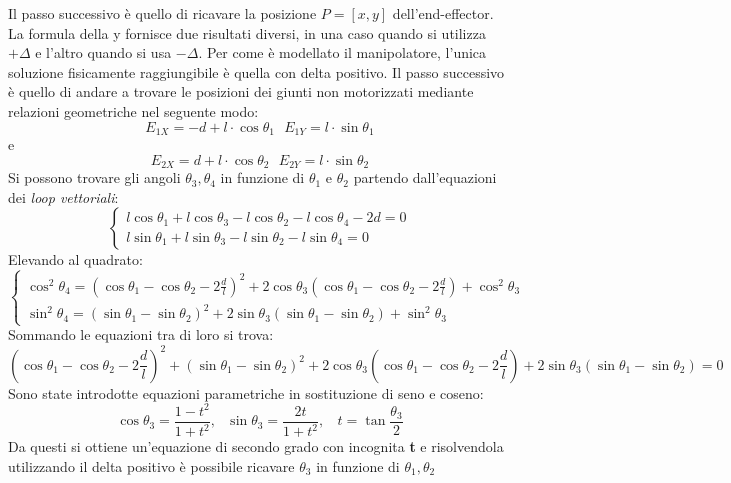 Il passo successivo è quello di ricavare la posizione $P=[x,y]$ dell'end-effector. La formula della y fornisce due risultati diversi, in una caso quando si utilizza $+\Delta$ e l'altro quando si usa $-\Delta$. Per come è modellato il manipolatore, l'unica soluzione fisicamente raggiungibile è quella con delta positivo. 
Il passo successivo è quello di andare a trovare le posizioni dei giunti non motorizzati mediante relazioni geometriche nel seguente modo: 
\begin{equation*}
    E_{1X} = -d+l\cdot \cos\theta_1 \ \ \  E_{1Y}=l\cdot \sin\theta_1
\end{equation*}
e
\begin{equation*}
    E_{2X} = d+ l\cdot \cos\theta_2 \ \ \  E_{2Y} = l\cdot \sin\theta_2
\end{equation*}
Si possono trovare gli angoli $\theta_3 , \theta_4$ in funzione di $\theta_1$ e $\theta_2$ partendo dall'equazioni dei \textit{loop vettoriali}:
\begin{equation}
	\begin{cases}
		l\cos\theta_1 + l\cos\theta_3 - l\cos\theta_2 -l\cos\theta_4 -2d = 0 \\
		l\sin\theta_1 +l\sin\theta_3 - l\sin\theta_2 -l\sin\theta_4 = 0
	\end{cases}
\label{eq:loopVettoriali}
\end{equation}
Elevando al quadrato:
\begin{equation*}
	\begin{cases}
	\cos^2\theta_4 = (\cos\theta_1-\cos\theta_2-2\frac{d}{l})^2 + 2\cos\theta_3(\cos\theta_1-\cos\theta_2-2\frac{d}{l}) +\cos^2\theta_3 \\
			\sin^2\theta_4 = (\sin\theta_1-\sin\theta_2)^2 + 2\sin\theta_3(\sin\theta_1-\sin\theta_2) +\sin^2\theta_3 
	\end{cases}
\end{equation*}
Sommando le equazioni tra di loro si trova:
\begin{equation*}
	(\cos\theta_1-\cos\theta_2-2\frac{d}{l})^2+ (\sin\theta_1-\sin\theta_2)^2+ 2\cos\theta_3(\cos\theta_1-\cos\theta_2-2\frac{d}{l})+ 2\sin\theta_3(\sin\theta_1-\sin\theta_2) = 0
\end{equation*}
Sono state introdotte equazioni parametriche in sostituzione di seno e coseno:
\begin{equation*}
	\cos\theta_3 = \frac{1-t^2}{1+t^2},\ \ \ \sin\theta_3 = \frac{2t}{1+t^2}, \ \ \ \  t =\tan\frac{\theta_3}{2}
\end{equation*}
Da questi si ottiene un'equazione di secondo grado con incognita \textbf{t} e risolvendola utilizzando il delta positivo è possibile ricavare $\theta_3$ in funzione di $\theta_1,\theta_2$
